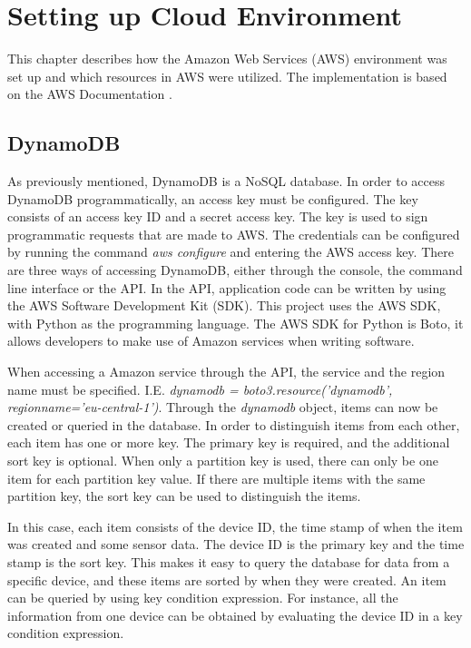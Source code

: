\chapter{Setting up Cloud Environment}
This chapter describes how the Amazon Web Services (AWS) environment was set up and which resources in AWS were utilized. The implementation is based on the AWS Documentation \cite{aws_docs}.


\section{DynamoDB}
As previously mentioned, DynamoDB is a NoSQL database. %
 In order to access DynamoDB programmatically, an access key must be configured. The key consists of an access key ID and a secret access key. %
The key is used to sign programmatic requests that are made to AWS. The credentials can be configured by running the command \textit{aws configure} and entering the AWS access key. There are three ways of accessing DynamoDB, either through the console, the command line interface or the API. In the API, application code can be written by using the AWS Software Development Kit (SDK). This project uses the AWS SDK, with Python as the programming language. The AWS SDK for Python is Boto, it allows developers to make use of Amazon services when writing software. 

When accessing a Amazon service through the API, the service and the region name must be specified. I.E. \textit{
dynamodb = boto3.resource('dynamodb', region\textunderscore name='eu-central-1')}. Through the \textit{dynamodb} object, items can now be created or queried in the database. In order to distinguish items from each other, each item has one or more key. The primary key is required, and the additional sort key is optional. When only a partition key is used, there can only be one item for each partition key value. If there are multiple items with the same partition key, the sort key can be used to distinguish the items. 

In this case, each item consists of the device ID, the time stamp of when the item was created and some sensor data.
The device ID is the primary key and the time stamp is the sort key. This makes it easy to query the database for data from a specific device, and these items are sorted by when they were created.  An item can be queried by using key condition expression. For instance, all the information from one device can be obtained by evaluating the device ID in a key condition expression.


